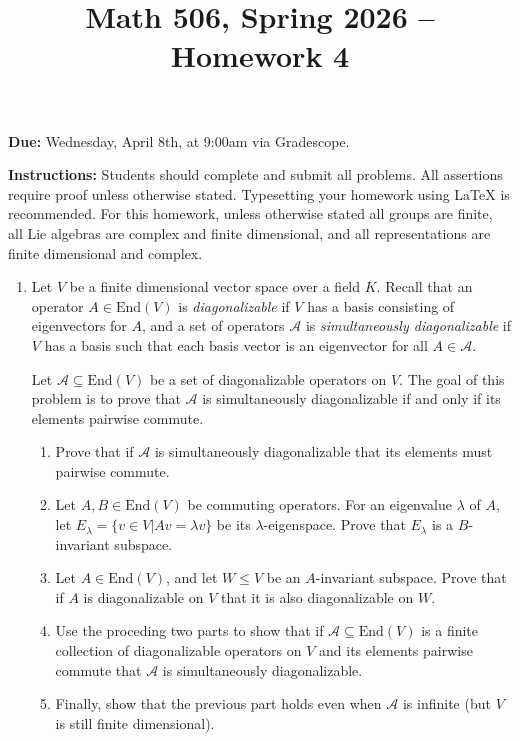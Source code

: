 \documentclass[12pt]{article}
\title{Math 506, Spring 2026 -- Homework 4}
\date{}
\newcommand{\End}{\text{End}}
\begin{document}
 \maketitle
\vspace{-80pt}

\textbf{Due:} Wednesday, April 8th, at 9:00am via Gradescope.

\textbf{Instructions:} Students should complete and submit all problems. All assertions require proof unless otherwise stated. Typesetting your homework using LaTeX is recommended. For this homework, unless otherwise stated all groups are finite, all Lie algebras are complex and finite dimensional, and all representations are finite dimensional and complex.

\begin{enumerate}

\item[1.] Let $V$ be a finite dimensional vector space over a field $K$. Recall that an operator $A\in\End(V)$ is \emph{diagonalizable} if $V$ has a basis consisting of eigenvectors for $A$, and a set of operators $\mathcal{A}$ is \emph{simultaneously diagonalizable} if $V$ has a basis such that each basis vector is an eigenvector for all $A\in\mathcal{A}$.

Let $\mathcal{A}\subseteq\End(V)$ be a set of diagonalizable operators on $V$. The goal of this problem is to prove that $\mathcal{A}$ is simultaneously diagonalizable if and only if its elements pairwise commute.

\begin{enumerate}
\item Prove that if $\mathcal{A}$ is simultaneously diagonalizable that its elements must pairwise commute.
\item Let $A,B\in \End(V)$ be commuting operators. For an eigenvalue $\lambda$ of $A$, let $E_\lambda = \{v\in V | Av = \lambda v\}$ be its $\lambda$-eigenspace. Prove that $E_\lambda$ is a $B$-invariant subspace.
\item Let $A\in\End(V)$, and let $W\le V$ be an $A$-invariant subspace. Prove that if $A$ is diagonalizable on $V$ that it is also diagonalizable on $W$.
\item Use the proceding two parts to show that if $\mathcal{A}\subseteq\End(V)$ is a finite collection of diagonalizable operators on $V$ and its elements pairwise commute that $\mathcal{A}$ is simultaneously diagonalizable.
\item Finally, show that the previous part holds even when $\mathcal{A}$ is infinite (but $V$ is still finite dimensional).
\end{enumerate}


\end{enumerate}
\end{document}
